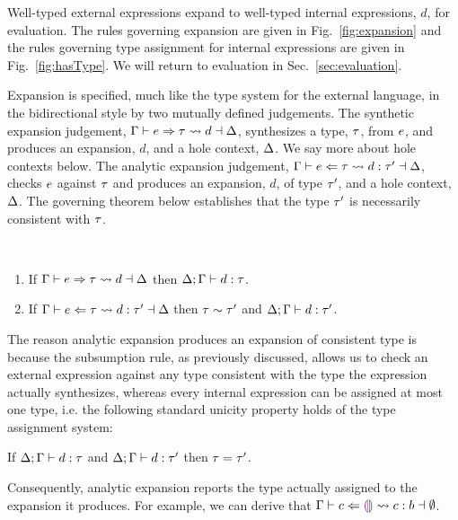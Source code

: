 


Well-typed external expressions expand to well-typed internal expressions, $d$, for evaluation. The rules governing expansion are given in Fig.~\ref{fig:expansion} and the rules governing type assignment for internal expressions are given in Fig.~\ref{fig:hasType}. We will return to evaluation in Sec.~\ref{sec:evaluation}.

Expansion is specified, much like the type system for the external language, in the bidirectional style by two mutually defined judgements. The synthetic expansion judgement, $\Gamma \vdash e \Rightarrow \tau \leadsto d \dashv \Delta$, synthesizes a type, $\tau$, from $e$, and produces an expansion, $d$, and a hole context, $\Delta$. We say more about hole contexts below. The analytic expansion judgement, $\Gamma \vdash e \Leftarrow \tau \leadsto d : \tau' \dashv \Delta$, checks $e$ against $\tau$ and produces an expansion, $d$, of type $\tau'$, and a hole context, $\Delta$. The governing theorem below establishes that the type $\tau'$ is necessarily consistent with $\tau$.
\begin{thm}\label{thm:typed-expansion} ~
  \begin{enumerate}[nolistsep]
    \item
      If $\Gamma \vdash e \Rightarrow \tau \leadsto d \dashv \Delta$
      then $\Delta; \Gamma \vdash d : \tau$.
    \item
      If $\Gamma \vdash e \Leftarrow \tau \leadsto d : \tau' \dashv \Delta$
      then $\tau \sim \tau'$ and $\Delta; \Gamma \vdash d : \tau'$.
  \end{enumerate}
\end{thm}
\noindent
The reason analytic expansion produces an expansion of consistent type is because the subsumption rule, as previously discussed, allows us to check an external expression against any type consistent with the type the expression actually synthesizes, whereas every internal expression can be assigned at most one type, i.e. the following standard unicity property holds of the type assignment system: 
\begin{thm}
  If $\Delta; \Gamma \vdash d : \tau$
  and $\Delta; \Gamma \vdash d : \tau'$
  then $\tau=\tau'$.
\end{thm}
\noindent
Consequently, analytic expansion reports the type actually assigned to the expansion it produces. For example, we can derive that $\Gamma \vdash c \Leftarrow \textcolor{violet}{\llparenthesis}\textcolor{violet}{\rrparenthesis} \leadsto c : b \dashv \emptyset$.%

